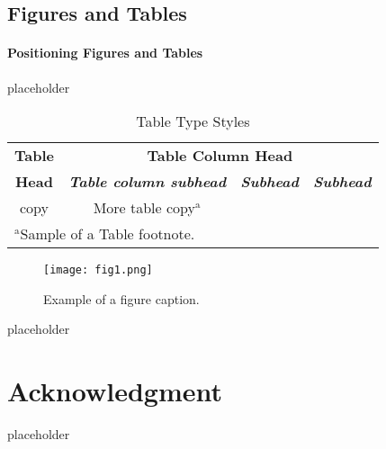 \documentclass[conference]{IEEEtran}
\begin{document}
\subsection{Figures and Tables}
\paragraph{Positioning Figures and Tables} placeholder

\begin{table}[htbp]
\caption{Table Type Styles}
\begin{center}
\begin{tabular}{|c|c|c|c|}
\hline
\textbf{Table}&\multicolumn{3}{|c|}{\textbf{Table Column Head}} \\
\cline{2-4} 
\textbf{Head} & \textbf{\textit{Table column subhead}}& \textbf{\textit{Subhead}}& \textbf{\textit{Subhead}} \\
\hline
copy& More table copy$^{\mathrm{a}}$& &  \\
\hline
\multicolumn{4}{l}{$^{\mathrm{a}}$Sample of a Table footnote.}
\end{tabular}
\label{tab1}
\end{center}
\end{table}

\begin{figure}[htbp]
\centerline{\texttt{[image: fig1.png]}}
\caption{Example of a figure caption.}
\label{fig}
\end{figure}

placeholder

\section*{Acknowledgment}

placeholder
\end{document}
